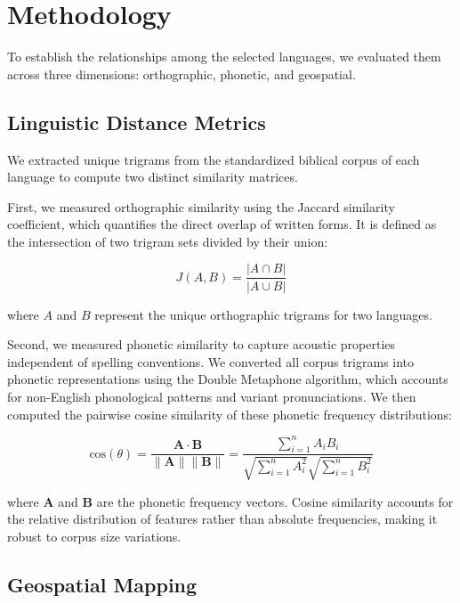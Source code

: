 \section{Methodology}

To establish the relationships among the selected languages, we evaluated them
across three dimensions: orthographic, phonetic, and geospatial.

\subsection{Linguistic Distance Metrics}

We extracted unique trigrams from the standardized biblical corpus of each
language to compute two distinct similarity matrices.

First, we measured orthographic similarity using the Jaccard similarity
coefficient, which quantifies the direct overlap of written forms. It is
defined as the intersection of two trigram sets divided by their union:

\begin{equation*}
    J(A, B) = \frac{|A \cap B|}{|A \cup B|}
\end{equation*}

where \(A\) and \(B\) represent the unique orthographic trigrams for two
languages.

Second, we measured phonetic similarity to capture acoustic properties
independent of spelling conventions. We converted all corpus trigrams into
phonetic representations using the Double Metaphone algorithm, which accounts
for non-English phonological patterns and variant pronunciations. We then
computed the pairwise cosine similarity of these phonetic frequency
distributions:

\begin{equation*}
    \text{cos}(\theta) = 
        \frac{\mathbf{A} \cdot \mathbf{B}}{\|\mathbf{A}\| \|\mathbf{B}\|} = 
        \frac{\sum_{i=1}^{n} A_i B_i}{\sqrt{\sum_{i=1}^{n} A_i^2} \sqrt{\sum_{i=1}^{n} B_i^2}}
\end{equation*}

where \(\mathbf{A}\) and \(\mathbf{B}\) are the phonetic frequency vectors.
Cosine similarity accounts for the relative distribution of features rather
than absolute frequencies, making it robust to corpus size variations.

\subsection{Geospatial Mapping}\label{sec:geo}

